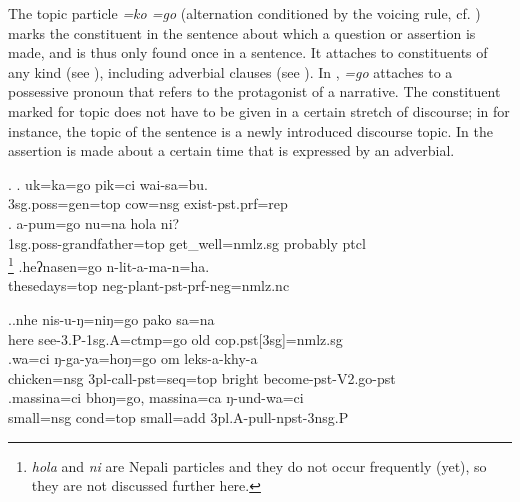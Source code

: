 The topic particle \emph{=ko \ti =go} (alternation conditioned by the voicing rule, cf. ) marks the constituent in the sentence about which a question or  assertion is made, and is thus only found once in a sentence. It  attaches to constituents of any kind (see \Next), including adverbial clauses (see \NNext). In \Next[a], \emph{=go} attaches to a possessive pronoun that refers to the protagonist of a narrative. The constituent marked for topic does not have to be given in a certain stretch of discourse; in \Next[b] for instance, the topic of the sentence is a newly introduced discourse topic. In \Next[c] the assertion is made about a certain time that is expressed by an adverbial. 

\ex. \ag. uk=ka=go  pik=ci wai-sa=bu.\\
{\sc 3sg.poss=gen=top} cow{\sc =nsg} exist{\sc -pst.prf=rep}\\
 
\bg. a-pum=go  nu=na hola ni?\\
		{\sc 1sg.poss-}grandfather{\sc =top} get\_well{\sc [3sg]=nmlz.sg} probably {\sc ptcl}\\
		\footnote{\emph{hola} and \emph{ni} are Nepali particles and they do not occur frequently (yet), so they are not discussed further here.} 
		\bg.heʔnasen=go    n-lit-a-ma-n=ha.\\
		thesedays{\sc =top} {\sc neg-}plant{\sc [3sg]-pst-prf-neg=nmlz.nc}\\
		 
		
		\ex.\ag.nhe  nis-u-ŋ=niŋ=go                     pako         sa=na\\
		here see{\sc [pst]-3.P-1sg.A=ctmp=go} old  {\sc cop.pst[3sg]=nmlz.sg}\\
		 
		\bg.wa=ci         ŋ-ga-ya=hoŋ=go                  om     leks-a-khy-a\\
		chicken{\sc =nsg} {\sc 3pl-}call{\sc -pst=seq=top} bright become{\sc [3]-pst-V2.go-pst}\\
		 
		\bg.massina=ci    bhoŋ=go,    massina=ca        ŋ-und-wa=ci\\
		small{\sc =nsg} {\sc cond=top} small{\sc =add} {\sc 3pl.A-}pull{\sc -npst-3nsg.P}\\
		 
				


